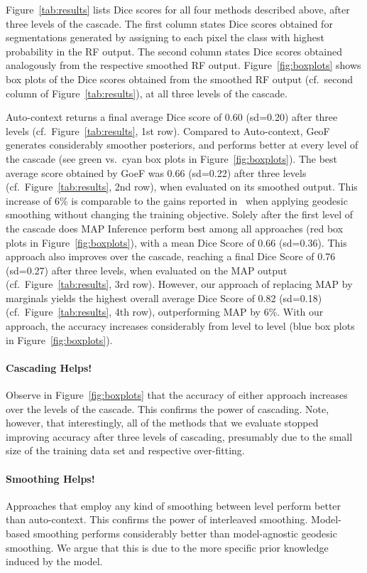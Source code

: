 \documentclass[10pt,twocolumn,letterpaper]{article}
\begin{document}
%
Figure~\ref{tab:results} lists Dice scores for all four methods described above, after three levels of the cascade. The first column states Dice scores obtained for segmentations generated by assigning to each pixel the class with highest probability in the RF output. The second column states Dice scores obtained analogously from the respective smoothed RF output. Figure~\ref{fig:boxplots} shows box plots of the Dice scores obtained from the smoothed RF output (cf.\ second column of Figure~\ref{tab:results}), at all three levels of the cascade. 

Auto-context returns a final average Dice score of 0.60 (sd=0.20) after three levels (cf.\ Figure~\ref{tab:results}, 1st row). 
%
Compared to Auto-context, GeoF generates considerably smoother posteriors, and performs better at every level of the cascade (see green vs.\ cyan box plots in Figure~\ref{fig:boxplots}). The best average score obtained by GoeF was 0.66 (sd=0.22) after three levels  (cf.\ Figure~\ref{tab:results}, 2nd row), when evaluated on its smoothed output. This increase of 6\% is comparable to the gains reported in~\cite{GeoForests2013} when applying geodesic smoothing without changing the training objective.
%
Solely after the first level of the cascade does MAP Inference perform best among all approaches (red box plots in Figure~\ref{fig:boxplots}), with a mean Dice Score of 0.66 (sd=0.36). This approach also improves over the cascade, reaching a final Dice Score of 0.76 (sd=0.27) after three levels, when evaluated on the MAP output (cf.\ Figure~\ref{tab:results}, 3rd row). 
%
However, our approach of replacing MAP by marginals yields the highest overall average Dice Score of 0.82 (sd=0.18) (cf.\ Figure~\ref{tab:results}, 4th row), outperforming MAP by 6\%. 
%
With our approach, the accuracy increases considerably from level to level (blue box plots in Figure~\ref{fig:boxplots}). 


\paragraph{Cascading Helps! }
Observe in Figure~\ref{fig:boxplots} that the accuracy of either approach increases over the levels of the cascade. This confirms the power of cascading. Note, however, that interestingly, all of the methods that we evaluate stopped improving accuracy after three levels of cascading, presumably due to the small size of the training data set and respective over-fitting. 

\paragraph{Smoothing Helps! }
Approaches that employ any kind of smoothing between level perform better than auto-context. This confirms the power of interleaved smoothing. Model-based smoothing performs considerably better than model-agnostic geodesic smoothing. We argue that this is due to the more specific prior knowledge induced by the model. 
\end{document}
